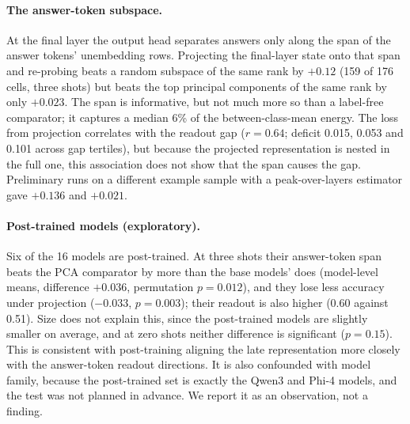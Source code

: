 \paragraph{The answer-token subspace.}
At the final layer the output head separates answers only along the span of the answer tokens'
unembedding rows. Projecting the final-layer state onto that span and re-probing beats a random
subspace of the same rank by $+0.12$ (159 of 176 cells, three shots) but beats the top principal
components of the same rank by only $+0.023$. The span is informative, but not much more so than a
label-free comparator; it captures a median 6\% of the between-class-mean energy. The loss from
projection correlates with the readout gap ($r = 0.64$; deficit 0.015, 0.053 and 0.101 across gap
tertiles), but because the projected representation is nested in the full one, this association does
not show that the span causes the gap. Preliminary runs on a different example sample with a peak-over-layers estimator gave
$+0.136$ and $+0.021$.

\paragraph{Post-trained models (exploratory).}
Six of the 16 models are post-trained. At three shots their answer-token span beats the PCA
comparator by more than the base models' does (model-level means, difference $+0.036$, permutation
$p = 0.012$), and they lose less accuracy under projection ($-0.033$, $p = 0.003$); their readout is
also higher (0.60 against 0.51). Size does not explain this, since the post-trained models are
slightly smaller on average, and at zero shots neither difference is significant ($p = 0.15$). This
is consistent with post-training aligning the late representation more closely with the
answer-token readout directions. It is also confounded with model family, because the post-trained
set is exactly the Qwen3 and Phi-4 models, and the test was not planned in advance. We report it as
an observation, not a finding.
